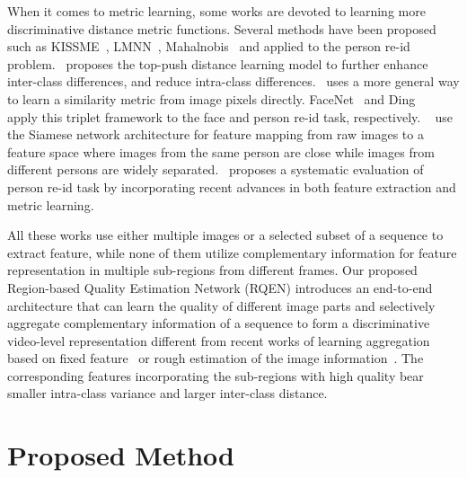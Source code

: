 \documentclass[letterpaper]{article} %
\begin{document}
When it comes to metric learning, some works are devoted to learning more discriminative distance metric functions. Several methods have been proposed such as KISSME~\cite{koestinger2012large}, LMNN~\cite{dikmen2010pedestrian}, Mahalnobis~\cite{roth2014mahalanobis} and applied to the person re-id problem.~\cite{you2016top} proposes the top-push distance learning model to further enhance inter-class differences, and reduce intra-class differences.~\cite{yi2014deep} uses a more general way to learn a similarity metric from image pixels directly.  FaceNet~\cite{schroff2015facenet} and Ding ~\cite{ding2015deep} apply this triplet framework to the face and person re-id task, respectively. ~\cite{li2014deepreid,ahmed2015improved} use the Siamese network architecture for feature mapping from raw images to a feature space where images from the same person are close while images from different persons are widely separated.~\cite{resystematic} proposes a systematic evaluation of person re-id task by incorporating recent advances in both feature extraction and metric learning.

All these works use either multiple images or a selected subset of a sequence to extract feature, while none of them utilize complementary information for feature representation in multiple sub-regions from different frames. Our proposed Region-based Quality Estimation Network (RQEN) introduces an end-to-end architecture that can learn the quality of different image parts and selectively aggregate complementary information of a sequence to form a discriminative video-level representation different from recent works of learning aggregation based on fixed feature~\cite{yang2016neural} or rough estimation of the image information~\cite{yu2017quality}. The corresponding features incorporating the sub-regions with high quality bear smaller intra-class variance and larger inter-class distance.

\section{Proposed Method}
\end{document}
